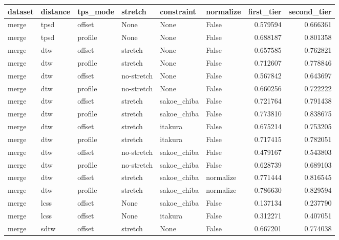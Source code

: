 \begin{tabular}{llllllrr}
\toprule
dataset & distance & tps\_mode &    stretch &  constraint & normalize &  first\_tier &  second\_tier \\
\midrule
  merge &     tpsd &   offset &       None &        None &     False &    0.579594 &     0.666361 \\
  merge &     tpsd &  profile &       None &        None &     False &    0.688187 &     0.801358 \\
  merge &      dtw &   offset &    stretch &        None &     False &    0.657585 &     0.762821 \\
  merge &      dtw &  profile &    stretch &        None &     False &    0.712607 &     0.778846 \\
  merge &      dtw &   offset & no-stretch &        None &     False &    0.567842 &     0.643697 \\
  merge &      dtw &  profile & no-stretch &        None &     False &    0.660256 &     0.722222 \\
  merge &      dtw &   offset &    stretch & sakoe\_chiba &     False &    0.721764 &     0.791438 \\
  merge &      dtw &  profile &    stretch & sakoe\_chiba &     False &    0.773810 &     0.838675 \\
  merge &      dtw &   offset &    stretch &     itakura &     False &    0.675214 &     0.753205 \\
  merge &      dtw &  profile &    stretch &     itakura &     False &    0.717415 &     0.782051 \\
  merge &      dtw &   offset & no-stretch & sakoe\_chiba &     False &    0.479167 &     0.543803 \\
  merge &      dtw &  profile & no-stretch & sakoe\_chiba &     False &    0.628739 &     0.689103 \\
  merge &      dtw &   offset &    stretch & sakoe\_chiba & normalize &    0.771444 &     0.816545 \\
  merge &      dtw &  profile &    stretch & sakoe\_chiba & normalize &    0.786630 &     0.829594 \\
  merge &     lcss &   offset &       None & sakoe\_chiba &     False &    0.137134 &     0.237790 \\
  merge &     lcss &   offset &       None &     itakura &     False &    0.312271 &     0.407051 \\
  merge &     sdtw &   offset &    stretch &        None &     False &    0.667201 &     0.774038 \\

\end{tabular}
